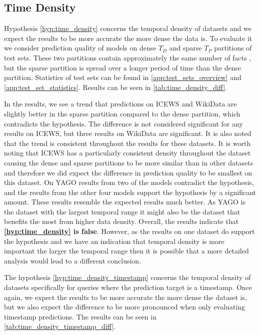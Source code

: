 \subsection{Time Density}
\label{sec:time_density_experiment}

Hypothesis \autoref{hyp:time_density} concerns the temporal density of datasets and we expect the results to be more accurate the more dense the data is.
To evaluate it we consider prediction quality of models on dense $T_D$ and sparse $T_P$ partitions of test sets. These two partitions contain approximately the same number of facts%
, but the sparse partition is spread over a longer period of time than the dense partition. 
Statistics of test sets can be found in \autoref{app:test_sets_overview} and \autoref{app:test_set_statistics}. 
Results can be seen in \autoref{tab:time_density_diff}.



In the results, we see a trend that predictions on ICEWS and WikiData are slightly better in the sparse partition compared to the dense partition, which contradicts the hypothesis.
The difference is not considered significant for any results on ICEWS, but three results on WikiData are significant. It is also noted that the trend is consistent throughout the results for these datasets.
It is worth noting that ICEWS has a particularly consistent density throughout the dataset causing the dense and sparse partitions to be more similar than in other datasets and therefore we did expect the difference in prediction quality to be smallest on this dataset.
On YAGO results from two of the models contradict the hypothesis, and the results from the other four models support the hypothesis by a significant amount. These results resemble the expected results much better. As YAGO is the dataset with the largest temporal range it might also be the dataset that benefits the most from higher data density.
Overall, the results indicate that \textbf{\autoref{hyp:time_density} is false}. However, as the results on one dataset do support the hypothesis and we have an indication that temporal density is more important the larger the temporal range then it is possible that a more detailed analysis would lead to a different conclusion.

The hypothesis \autoref{hyp:time_density_timestamp} concerns the temporal density of datasets specifically for queries where the prediction target is a timestamp. Once again, we expect the results to be more accurate the more dense the dataset is, but we also expect the difference to be more pronounced when only evaluating timestamp predictions. The results can be seen in \autoref{tab:time_density_timestamp_diff}.

